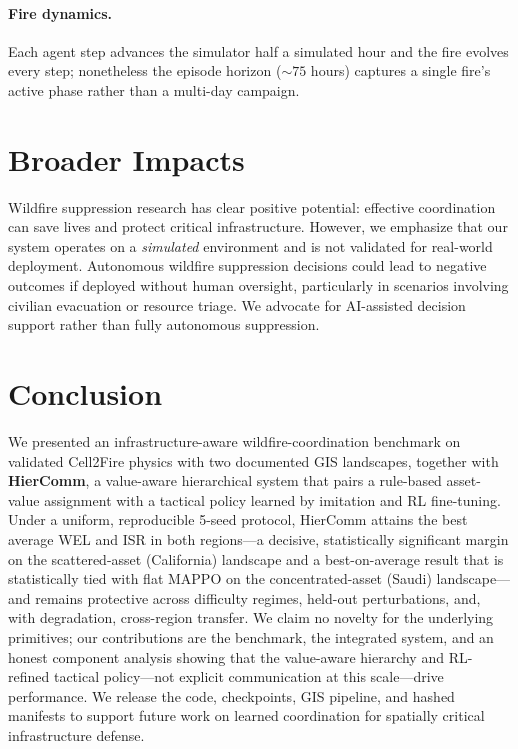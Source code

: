 \documentclass[letterpaper]{article}
\begin{document}
\paragraph{Fire dynamics.}
Each agent step advances the simulator half a simulated hour and the fire evolves every step; nonetheless the episode horizon ($\sim75$ hours) captures a single fire's active phase rather than a multi-day campaign.

\section{Broader Impacts}
\label{sec:impacts}

Wildfire suppression research has clear positive potential: effective coordination can save lives and protect critical infrastructure. However, we emphasize that our system operates on a \emph{simulated} environment and is not validated for real-world deployment. Autonomous wildfire suppression decisions could lead to negative outcomes if deployed without human oversight, particularly in scenarios involving civilian evacuation or resource triage. We advocate for AI-assisted decision support rather than fully autonomous suppression.

\section{Conclusion}
\label{sec:conclusion}

We presented an infrastructure-aware wildfire-coordination benchmark on validated Cell2Fire physics with two documented GIS landscapes, together with \textbf{HierComm}, a value-aware hierarchical system that pairs a rule-based asset-value assignment with a tactical policy learned by imitation and RL fine-tuning. Under a uniform, reproducible 5-seed protocol, HierComm attains the best average WEL and ISR in both regions---a decisive, statistically significant margin on the scattered-asset (California) landscape and a best-on-average result that is statistically tied with flat MAPPO on the concentrated-asset (Saudi) landscape---and remains protective across difficulty regimes, held-out perturbations, and, with degradation, cross-region transfer. We claim no novelty for the underlying primitives; our contributions are the benchmark, the integrated system, and an honest component analysis showing that the value-aware hierarchy and RL-refined tactical policy---not explicit communication at this scale---drive performance. We release the code, checkpoints, GIS pipeline, and hashed manifests to support future work on learned coordination for spatially critical infrastructure defense.
\end{document}
